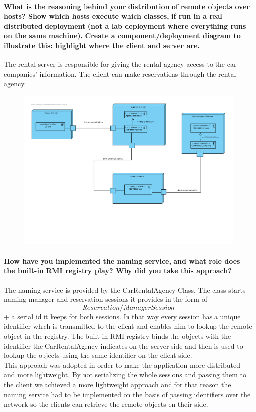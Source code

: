 \documentclass{ds-report}
\begin{document}
	
	\paragraph{What is the reasoning behind your distribution of remote objects over hosts? Show which
hosts execute which classes, if run in a real distributed deployment (not a lab deployment where everything runs on the same machine). Create a component/deployment diagram to illustrate this: highlight where the client and server are.\\}
	The rental server is responsible for giving the rental agency access to the car companies' information. The client can make reservations through the rental agency.
	\begin{figure}[h]
	\includegraphics[scale=0.5]{deploymentDiagram}
	\end{figure}	
	
	\paragraph{How have you implemented the naming service, and what role does the built-in RMI registry play? Why did you take this approach?\\}
    The naming service is provided by the CarRentalAgency Class. The class starts naming manager and reservation sessions it provides in the form of
    \[Reservation/ManagerSession\] + a serial id it keeps for both sessions. In that way every session has a unique identifier which is transmitted to
    the client and enables him to lookup the remote object in the registry. The built-in RMI registry binds the objects with the identifier the CarRentalAgency
    indicates on the server side and then is used to lookup the objects using the same identifier on the client side.\\
    This approach was adopted in order to make the application more distributed and more lightweight. By not serializing the whole sessions and passing them
    to the client we achieved a more lightweight approach and for that reason the naming service had to be implemented on the basis of
    passing identifiers over the network so the clients can retrieve the remote objects on their side.
	
\end{document}
